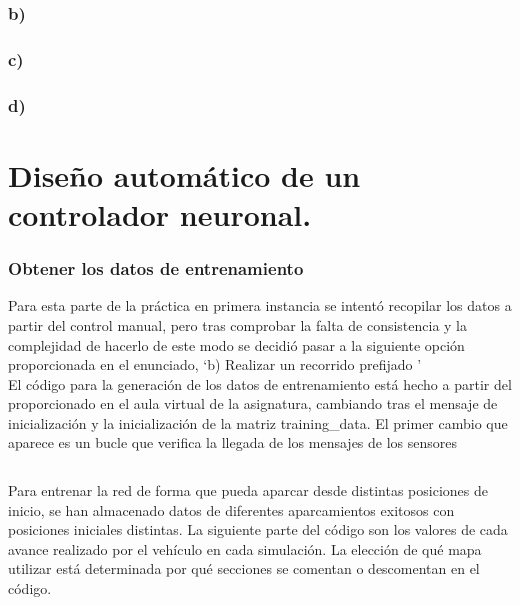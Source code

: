\documentclass[a4paper, 12pt]{article}
\begin{document}
    \section{b)}
    
    \section{c)}
    
    \section{d)}

                
    \part{Diseño automático de un controlador neuronal.}
	
    \section{Obtener los datos de entrenamiento}
        Para esta parte de la práctica en primera instancia se intentó recopilar los datos a partir del control manual, pero tras comprobar la falta de consistencia y la complejidad de hacerlo de este modo se decidió pasar a la siguiente opción proporcionada en el enunciado, \textquoteleft b) Realizar un recorrido prefijado \textquoteright \\
        
    	El código para la generación de los datos de entrenamiento está hecho a partir del proporcionado en el aula virtual de la asignatura, cambiando tras el mensaje de inicialización y la inicialización de la matriz training\_data. El primer cambio que aparece es un bucle que verifica la llegada de los mensajes de los sensores
    
        \inputminted[fontsize=\scriptsize, linenos, breaklines=true, xleftmargin=0.75cm, frame=lines, firstline=70, lastline=77]{matlab}{code/maniobra_park_ackerman_datos_entrenamiento_alumnos.m}
    
        Para entrenar la red de forma que pueda aparcar desde distintas posiciones de inicio, se han almacenado datos de diferentes aparcamientos exitosos con posiciones iniciales distintas. La siguiente parte del código son los valores de cada avance realizado por el vehículo en cada simulación. La elección de qué mapa utilizar está determinada por qué secciones se comentan o descomentan en el código.
    
\end{document}
